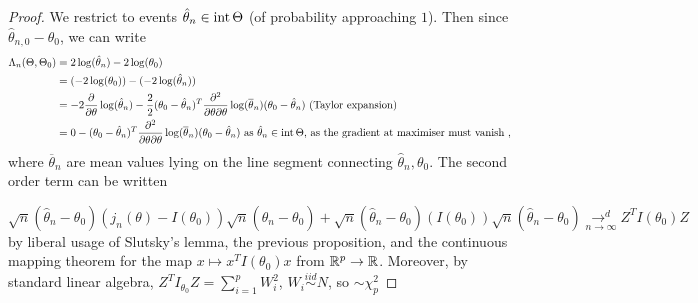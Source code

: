 \documentclass[a4paper]{article}
\begin{document}
\begin{proof}
	We restrict to events $\hat{\theta}_n \in\operatorname{int} \Theta$ (of probability approaching $1$). Then since $\hat{\theta}_{n,0} - \theta_0$, we can write 
	\begin{align*}
		\Lambda_n(\Theta,\Theta_0) &= 2\log(\hat{\theta}_n) - 2\log(\theta_0) \\
		&= (-2\log(\theta_0)) -(-2\log(\hat{\theta}_n)) \\
		&= -2 \frac{\partial }{\partial \theta} \log(\hat{\theta}_n) - \frac{2}{2} (\theta_0 - \hat{\theta}_n)^{T} \frac{\partial ^2}{\partial \theta\partial\theta} \log(\overline{\theta}_n)(\theta_0 - \hat{\theta}_n) \text{ (Taylor expansion)} \\ 
		&= 0 - (\theta_0 - \hat{\theta}_n)^{T} \frac{\partial ^2}{\partial \theta\partial\theta} \log(\overline{\theta}_n)(\theta_0 - \hat{\theta}_n) \text{ as $\hat{\theta}_n \in\operatorname{int} \Theta$, as the gradient at maximiser must vanish }
	,\end{align*}
	where $\overline{\theta}_n$ are mean values lying on the line segment connecting $\hat{\theta}_n, \theta_0$. The second order term can be written

\[
	\sqrt{n}(\hat{\theta}_n - \theta_0)(j_n(\theta) - I(\theta_0))\sqrt{n}(\hat{\theta}_n - \theta_0) + \sqrt{n}(\hat{\theta}_n - \theta_0)(I(\theta_0))\sqrt{n}(\hat{\theta}_n - \theta_0) \underset{n\to \infty}{\to ^{d}} Z^{T}I(\theta_0)Z
		\]
by liberal usage of Slutsky's lemma, the previous proposition, and the continuous mapping theorem for the map $x \mapsto x^{T}I(\theta_0)x$ from $\mathbb{R}^{p} \to \mathbb{R}$. Moreover, by standard linear algebra, $Z^{T}I_{\theta_0}Z = \sum_{i=1}^{p} W_{i}^2$, $W_i \stackrel{iid}{\sim} N$, so $\sim \chi^2_{p}$ 
\end{proof}
\end{document}
